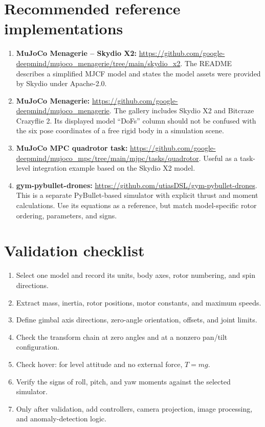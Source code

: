 \documentclass[11pt,a4paper]{article}
\begin{document}
\section{Recommended reference implementations}
\begin{enumerate}[leftmargin=1.6em]
\item \textbf{MuJoCo Menagerie -- Skydio X2:}
\url{https://github.com/google-deepmind/mujoco_menagerie/tree/main/skydio_x2}. The README describes a simplified MJCF model and states the model assets were provided by Skydio under Apache-2.0.
\item \textbf{MuJoCo Menagerie:}
\url{https://github.com/google-deepmind/mujoco_menagerie}. The gallery includes Skydio X2 and Bitcraze Crazyflie 2. Its displayed model ``DoFs'' column should not be confused with the six pose coordinates of a free rigid body in a simulation scene.
\item \textbf{MuJoCo MPC quadrotor task:}
\url{https://github.com/google-deepmind/mujoco_mpc/tree/main/mjpc/tasks/quadrotor}. Useful as a task-level integration example based on the Skydio X2 model.
\item \textbf{gym-pybullet-drones:}
\url{https://github.com/utiasDSL/gym-pybullet-drones}. This is a separate PyBullet-based simulator with explicit thrust and moment calculations. Use its equations as a reference, but match model-specific rotor ordering, parameters, and signs.
\end{enumerate}

\section{Validation checklist}
\begin{enumerate}[leftmargin=1.6em]
\item Select one model and record its units, body axes, rotor numbering, and spin directions.
\item Extract mass, inertia, rotor positions, motor constants, and maximum speeds.
\item Define gimbal axis directions, zero-angle orientation, offsets, and joint limits.
\item Check the transform chain at zero angles and at a nonzero pan/tilt configuration.
\item Check hover: for level attitude and no external force, \(T=mg\).
\item Verify the signs of roll, pitch, and yaw moments against the selected simulator.
\item Only after validation, add controllers, camera projection, image processing, and anomaly-detection logic.
\end{enumerate}
\end{document}
